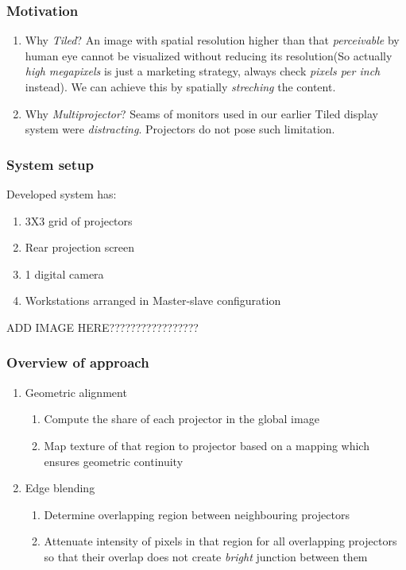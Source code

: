 \documentclass{beamer}
\begin{document}
\begin{frame}
\frametitle{Motivation}
\begin{enumerate}
\item Why \textit{Tiled}?\newline
An image with spatial resolution higher than that \textit{perceivable} by human eye cannot be visualized without reducing its resolution(So actually \textit{high megapixels} is just a marketing strategy, always check \textit{pixels per inch} instead). We can achieve this by spatially \textit{streching} the content.
\item Why \textit{Multiprojector}?\newline
Seams of monitors used in our earlier Tiled display system were \textit{distracting}. Projectors do not pose such limitation.
\end{enumerate}
\end{frame}

\begin{frame}
\frametitle{System setup}
Developed system has:
\begin{enumerate}
\item 3X3 grid of projectors
\item Rear projection screen
\item 1 digital camera
\item Workstations arranged in Master-slave configuration
\end{enumerate}
ADD IMAGE HERE?????????????????
\end{frame}

\begin{frame}
\frametitle{Overview of approach}
\begin{enumerate}
\item Geometric alignment
\begin{enumerate}
\item Compute the share of each projector in the global image
\item Map texture of that region to projector based on a mapping which ensures geometric continuity
\end{enumerate}
\item Edge blending
\begin{enumerate}
\item Determine overlapping region between neighbouring projectors
\item Attenuate intensity of pixels in that region for all overlapping projectors so that their overlap does not create \textit{bright} junction between them
\end{enumerate}
\end{enumerate}
\end{frame}
\end{document}
